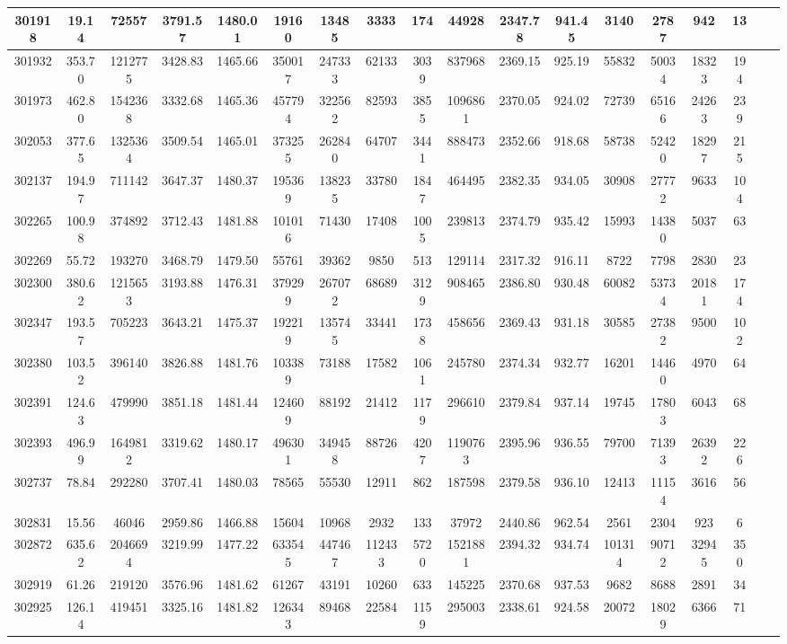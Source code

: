 \documentclass[10pt]{extarticle}
\begin{document}
\begin{longtable}{|c|c|c|c|c|c|c|c|c|c|c|c|c|c|c|c|c|c|}
\hline 
301918&19.14&72557&3791.57&1480.01&19160&13485&3333&174&44928&2347.78&941.45&3140&2787&942&13 \\ 
\hline 
301932&353.70&1212775&3428.83&1465.66&350017&247333&62133&3039&837968&2369.15&925.19&55832&50034&18323&194 \\ 
\hline 
301973&462.80&1542368&3332.68&1465.36&457794&322562&82593&3855&1096861&2370.05&924.02&72739&65166&24263&239 \\ 
\hline 
302053&377.65&1325364&3509.54&1465.01&373255&262840&64707&3441&888473&2352.66&918.68&58738&52420&18297&215 \\ 
\hline 
302137&194.97&711142&3647.37&1480.37&195369&138235&33780&1847&464495&2382.35&934.05&30908&27772&9633&104 \\ 
\hline 
302265&100.98&374892&3712.43&1481.88&101016&71430&17408&1005&239813&2374.79&935.42&15993&14380&5037&63 \\ 
\hline 
302269&55.72&193270&3468.79&1479.50&55761&39362&9850&513&129114&2317.32&916.11&8722&7798&2830&23 \\ 
\hline 
302300&380.62&1215653&3193.88&1476.31&379299&267072&68689&3129&908465&2386.80&930.48&60082&53734&20181&174 \\ 
\hline 
302347&193.57&705223&3643.21&1475.37&192219&135745&33441&1738&458656&2369.43&931.18&30585&27382&9500&102 \\ 
\hline 
302380&103.52&396140&3826.88&1481.76&103389&73188&17582&1061&245780&2374.34&932.77&16201&14460&4970&64 \\ 
\hline 
302391&124.63&479990&3851.18&1481.44&124609&88192&21412&1179&296610&2379.84&937.14&19745&17803&6043&68 \\ 
\hline 
302393&496.99&1649812&3319.62&1480.17&496301&349458&88726&4207&1190763&2395.96&936.55&79700&71393&26392&226 \\ 
\hline 
302737&78.84&292280&3707.41&1480.03&78565&55530&12911&862&187598&2379.58&936.10&12413&11154&3616&56 \\ 
\hline 
302831&15.56&46046&2959.86&1466.88&15604&10968&2932&133&37972&2440.86&962.54&2561&2304&923&6 \\ 
\hline 
302872&635.62&2046694&3219.99&1477.22&633545&447467&112433&5720&1521881&2394.32&934.74&101314&90712&32945&350 \\ 
\hline 
302919&61.26&219120&3576.96&1481.62&61267&43191&10260&633&145225&2370.68&937.53&9682&8688&2891&34 \\ 
\hline 
302925&126.14&419451&3325.16&1481.82&126343&89468&22584&1159&295003&2338.61&924.58&20072&18029&6366&71 \\ 

\end{longtable}
\end{document}
